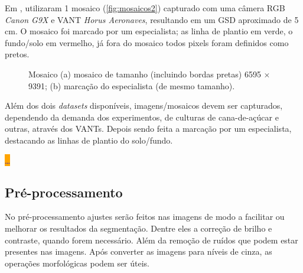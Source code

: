 \documentclass[12pt, a4paper, english, brazil]{article}
\newcommand{\dotsBlue}{\colorbox{orange}{\textcolor{blue}{\dots}}}
\begin{document}
Em , utilizaram 1 mosaico \cite{CropRowsDataset2019} (\autoref{fig:mosaicos2}) capturado com uma câmera RGB \textit{Canon G9X} e VANT \textit{Horus Aeronaves}, resultando em um GSD aproximado de 5 cm. O mosaico foi marcado por um especialista; as linha de plantio em verde, o fundo/solo em vermelho, já fora do mosaico todos pixels foram definidos como pretos.

\begin{figure}[htbp]
    \centering
    \caption{Mosaico  (a) mosaico de tamanho (incluindo bordas pretas) 6595 $\times$ 9391; (b) marcação do especialista (de mesmo tamanho).}
    \label{fig:mosaicos2}
\end{figure}

Além dos dois \textit{datasets} disponíveis, imagens/mosaicos devem ser capturados, dependendo da demanda dos experimentos, de culturas de cana-de-açúcar e outras, através dos VANTs. Depois sendo feita a marcação por um especialista, destacando as linhas de plantio do solo/fundo.

\dotsBlue

\subsection{Pré-processamento}

No pré-processamento ajustes serão feitos nas imagens de modo a facilitar ou melhorar os resultados da segmentação. Dentre eles a correção de brilho e contraste, quando forem necessário. Além da remoção de ruídos que podem estar presentes nas imagens. Após converter as imagens para níveis de cinza, as operações morfológicas podem ser úteis.
\end{document}
